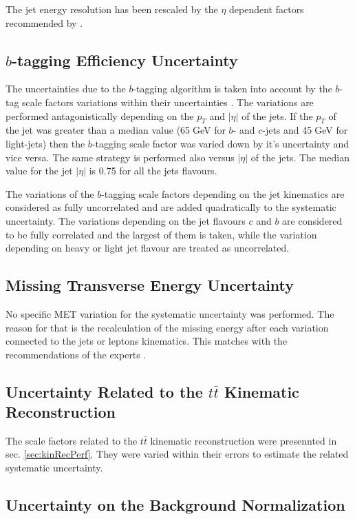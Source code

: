 The jet energy resolution has been rescaled by the $\eta$ dependent factors recommended by \cite{TWikiSystJER}.

\subsection{$b$-tagging Efficiency Uncertainty}

The uncertainties due to the $b$-tagging algorithm is taken into account by the $b$-tag scale factors variations within their
uncertainties \cite{CMS-PAS-BTV-13-001}. The variations are performed antagonistically depending on the $p_{T}$ and $|\eta|$ of the jets.
If the $p_{T}$ of the jet was greater than a median value (65$\;$GeV for $b$- and $c$-jets and 45$\;$GeV for light-jets) then 
the $b$-tagging scale factor was varied down by it's uncertainty and vice versa. The same strategy is performed also versus $|\eta|$
of the jets. The median value for the jet $|\eta|$ is 0.75 for all the jets flavours.

The variations of the $b$-tagging scale factors depending on the jet kinematics are considered as fully uncorrelated and are added
quadratically to the systematic uncertainty. The variations depending on the jet flavours $c$ and $b$ are considered to be 
fully correlated and the largest of them is taken, while the variation depending on heavy or light jet flavour are treated as uncorrelated.

\subsection{Missing Transverse Energy Uncertainty}

No specific MET variation for the systematic uncertainty was performed. The reason for that is the recalculation of the missing energy
after each variation connected to the jets or leptons kinematics. This matches with the recommendations of the experts \cite{CMS-PAS-JME-12-002}.

\subsection{Uncertainty Related to the $t\bar{t}$ Kinematic Reconstruction}

The scale factors related to the $t\bar{t}$ kinematic reconstruction were presennted in sec. \ref{sec:kinRecPerf}. They were varied 
within their errors to estimate the related systematic uncertainty.

\subsection{Uncertainty on the Background Normalization}


